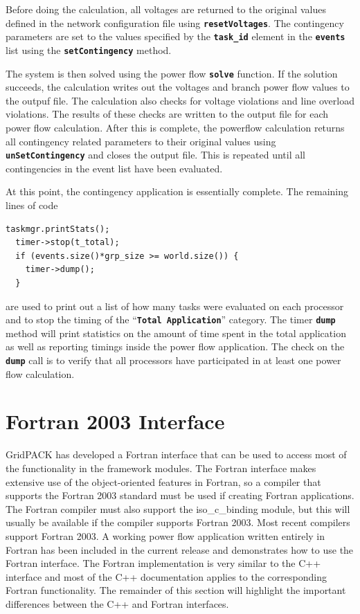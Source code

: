 \documentclass[12pt]{report} %
\begin{document}
Before doing the calculation, all voltages are returned to the original values defined in the network configuration file using \texttt{\textbf{resetVoltages}}. The contingency parameters are set to the values specified by the \texttt{\textbf{task\_id}} element in the \texttt{\textbf{events}} list using the \texttt{\textbf{setContingency}} method.

The system is then solved using the power flow \texttt{\textbf{solve}} function. If the solution succeeds, the calculation writes out the voltages and branch power flow values to the outpuf file. The calculation also checks for voltage violations and line overload violations. The results of these checks are written to the output file for each power flow calculation. After this is complete, the powerflow calculation returns all contingency related parameters to their original values using \texttt{\textbf{unSetContingency}} and closes the output file. This is repeated until all contingencies in the event list have been evaluated.

At this point, the contingency application is essentially complete. The remaining lines of code

{
\color{red}
\begin{Verbatim}[fontseries=b]
  taskmgr.printStats();
  timer->stop(t_total);
  if (events.size()*grp_size >= world.size()) {
    timer->dump();
  }
\end{Verbatim}
}

are used to print out a list of how many tasks were evaluated on each processor and to stop the timing of the ``\texttt{\textbf{Total Application}}'' category. The timer \texttt{\textbf{dump}} method will print statistics on the amount of time spent in the total application as well as reporting timings inside the power flow application. The check on the \texttt{\textbf{dump}} call is to verify that all processors have participated in at least one power flow calculation.

\chapter{Fortran 2003 Interface}

GridPACK has developed a Fortran interface that can be used to access most of the functionality in the framework modules. The Fortran interface makes extensive use of the object-oriented features in Fortran, so a compiler that supports the Fortran 2003 standard must be used if creating Fortran applications. The Fortran compiler must also support the iso\_c\_binding module, but this will usually be available if the compiler supports Fortran 2003. Most recent compilers support Fortran 2003. A working power flow application written entirely in Fortran has been included in the current release and demonstrates how to use the Fortran interface. The Fortran implementation is very similar to the C++ interface and most of the C++ documentation applies to the corresponding Fortran functionality. The remainder of this section will highlight the important differences between the C++ and Fortran interfaces.
\end{document}
